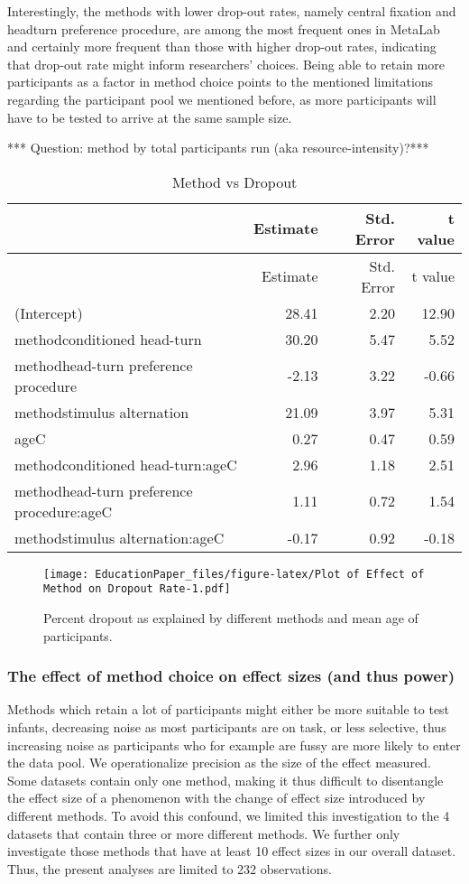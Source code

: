 \documentclass[english,floatsintext,man]{apa6}
\begin{document}
Interestingly, the methods with lower drop-out rates, namely central
fixation and headturn preference procedure, are among the most frequent
ones in MetaLab and certainly more frequent than those with higher
drop-out rates, indicating that drop-out rate might inform researchers'
choices. Being able to retain more participants as a factor in method
choice points to the mentioned limitations regarding the participant
pool we mentioned before, as more participants will have to be tested to
arrive at the same sample size.

*** Question: method by total participants run (aka
resource-intensity)?***

\begin{longtable}[c]{@{}lrrr@{}}
\caption{Method vs Dropout}\tabularnewline
\toprule
& Estimate & Std. Error & t value\tabularnewline
\midrule
\endfirsthead
\toprule
& Estimate & Std. Error & t value\tabularnewline
\midrule
\endhead
(Intercept) & 28.41 & 2.20 & 12.90\tabularnewline
methodconditioned head-turn & 30.20 & 5.47 & 5.52\tabularnewline
methodhead-turn preference procedure & -2.13 & 3.22 &
-0.66\tabularnewline
methodstimulus alternation & 21.09 & 3.97 & 5.31\tabularnewline
ageC & 0.27 & 0.47 & 0.59\tabularnewline
methodconditioned head-turn:ageC & 2.96 & 1.18 & 2.51\tabularnewline
methodhead-turn preference procedure:ageC & 1.11 & 0.72 &
1.54\tabularnewline
methodstimulus alternation:ageC & -0.17 & 0.92 & -0.18\tabularnewline
\bottomrule
\end{longtable}

\begin{figure}[htbp]
\centering
\texttt{[image: EducationPaper\_files/figure-latex/Plot of Effect of Method on Dropout Rate-1.pdf]}
\caption{Percent dropout as explained by different methods and mean age
of participants.}
\end{figure}

\subsubsection{The effect of method choice on effect sizes (and thus
power)}\label{the-effect-of-method-choice-on-effect-sizes-and-thus-power}

Methods which retain a lot of participants might either be more suitable
to test infants, decreasing noise as most participants are on task, or
less selective, thus increasing noise as participants who for example
are fussy are more likely to enter the data pool. We operationalize
precision as the size of the effect measured. Some datasets contain only
one method, making it thus difficult to disentangle the effect size of a
phenomenon with the change of effect size introduced by different
methods. To avoid this confound, we limited this investigation to the 4
datasets that contain three or more different methods. We further only
investigate those methods that have at least 10 effect sizes in our
overall dataset. Thus, the present analyses are limited to 232
observations.
\end{document}
